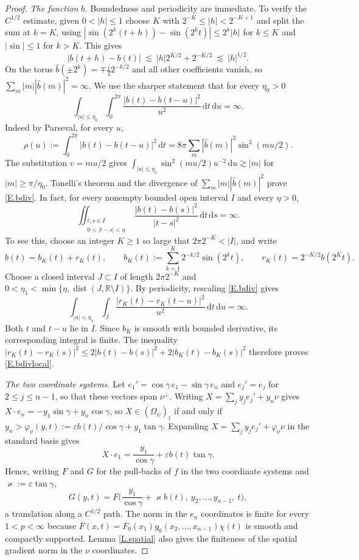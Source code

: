 \documentclass[10pt,a4paper]{amsart}
\numberwithin{equation}{section}
\newcommand{\R}{\mathbb R}
\newcommand{\wh}{\widehat}
\newcommand{\om}{\Omega}
\renewcommand{\d}{\,\mathrm d}
\begin{document}
\begin{proof}
\emph{The function $b$.} Boundedness and periodicity are immediate. To verify
the $C^{1/2}$ estimate, given $0<|h|\le1$ choose $K$ with
$2^{-K}\le|h|<2^{-K+1}$ and split the sum at $k=K$, using
$|\sin(2^k(t+h))-\sin(2^kt)|\le2^k|h|$ for $k\le K$ and $|\sin|\le1$ for
$k>K$. This gives
$$|b(t+h)-b(t)|\ \lesssim\ |h|2^{K/2}+2^{-K/2}\ \lesssim\ |h|^{1/2} .$$
On the torus $\wh b(\pm2^k)=\mp\frac i22^{-k/2}$ and all other coefficients
vanish, so $\sum_m|m||\wh b(m)|^2=\infty$. We use the sharper statement
that for every $\eta_0>0$
\begin{equation}\label{E.bdiv}
  \int_{|u|\le\eta_0}\int_0^{2\pi}\frac{|b(t)-b(t-u)|^2}{u^2}\d t\d u=\infty .
\end{equation}
Indeed by Parseval, for every $u$,
\[
  \rho(u):=\int_0^{2\pi}|b(t)-b(t-u)|^2\d t
  =8\pi\sum_m|\wh b(m)|^2\sin^2(mu/2) .
\]
The substitution $v=mu/2$ gives
$\int_{|u|\le\eta_0}\sin^2(mu/2)u^{-2}\d u\gtrsim|m|$
for $|m|\ge\pi/\eta_0$. Tonelli's theorem and the divergence of
$\sum_m|m||\wh b(m)|^2$ prove \eqref{E.bdiv}.
In fact, for every nonempty bounded open interval $I$ and every $\eta>0$,
\begin{equation}\label{E.bdivlocal}
 \iint_{\substack{t,s\in I\\0<|t-s|<\eta}}
 \frac{|b(t)-b(s)|^2}{|t-s|^2}\d t\d s=\infty.
\end{equation}
To see this, choose an integer $K\ge1$ so large that $2\pi2^{-K}<|I|$,
and write
\[
 b(t)=b_K(t)+r_K(t),\qquad
 b_K(t):=\sum_{k=1}^K2^{-k/2}\sin(2^kt),\qquad
 r_K(t)=2^{-K/2}b(2^Kt).
\]
Choose a closed interval $J\subset I$ of length $2\pi2^{-K}$ and
$0<\eta_1<\min\{\eta,\operatorname{dist}(J,\R\setminus I)\}$.
By periodicity, rescaling \eqref{E.bdiv} gives
\[
 \int_{|u|<\eta_1}\int_J
 \frac{|r_K(t)-r_K(t-u)|^2}{u^2}\d t\d u=\infty.
\]
Both $t$ and $t-u$ lie in $I$. Since $b_K$ is smooth with bounded
derivative, its corresponding integral is finite. The inequality
$|r_K(t)-r_K(s)|^2\le2|b(t)-b(s)|^2+2|b_K(t)-b_K(s)|^2$
therefore proves \eqref{E.bdivlocal}.

\emph{The two coordinate systems.} Let
$e_1'=\cos\gamma\,e_1-\sin\gamma\,e_n$ and $e_j'=e_j$ for
$2\le j\le n-1$, so that these vectors span $\nu^\perp$. Writing
$X=\sum_jy_je_j'+y_n\nu$ gives $X\cdot e_n=-y_1\sin\gamma+y_n\cos\gamma$, so
$X\in(\om_\psi)_t$ if and only if
$y_n>\varphi_\nu(y,t):=\varepsilon b(t)/\cos\gamma+y_1\tan\gamma$. Expanding
$X=\sum_jy_je_j'+\varphi_\nu\nu$ in the standard basis gives
$$X\cdot e_1=\frac{y_1}{\cos\gamma}+\varepsilon b(t)\tan\gamma .$$
Hence, writing $F$ and $G$ for
the pull-backs of $f$ in the two coordinate systems and $\varkappa:=\varepsilon\tan\gamma$,
\begin{equation}\label{E.framecx}
  G(y,t)=F\Big(\frac{y_1}{\cos\gamma}+\varkappa b(t),\ y_2,\dots,y_{n-1},\ t\Big),
\end{equation}
a translation along a $C^{1/2}$ path. The norm in the $e_n$ coordinates is
finite for every $1<p<\infty$ because
$F(x,t)=F_0(x_1)g_0(x_2,\dots,x_{n-1})\chi(t)$ is smooth and compactly
supported. Lemma \ref{L.spatial} also gives the finiteness of the spatial
gradient norm in the $\nu$ coordinates.


\end{proof}
\end{document}
